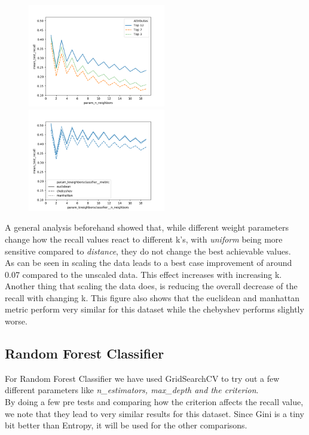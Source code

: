 \begin{figure}
\begin{floatrow}
    {\includegraphics[width=6cm]{onlineshop/plots/knn_wo_preprocessing.png}\label{fig:knn_wo_pre}}
    {\includegraphics[width=6cm]{onlineshop/plots/knn_uniform_metric_comparison.png}\label{fig:knn_w_pre}}
\end{floatrow}
\end{figure}
A general analysis beforehand showed that, while different weight parameters change how the recall values react to different k's, with \textit{uniform} being more sensitive compared to  \textit{distance}, they do not change the best achievable values.\\
\newline
As can be seen in  scaling the data leads to a best case improvement of around 0.07 compared to the unscaled data. This effect increases with increasing k. Another thing that scaling the data does, is reducing the overall decrease of the recall with changing k. This figure also shows that the euclidean and manhattan metric perform very similar for this dataset while the chebyshev performs slightly worse. 

\subsection{Random Forest Classifier}
For Random Forest Classifier we have used GridSearchCV to try out a few different parameters like \textit{n\_estimators, max\_depth and the criterion}. \\
\newline
By doing a few pre tests and comparing how the criterion affects the recall value, we note that they lead to very similar results for this dataset. Since Gini is a tiny bit better than Entropy, it will be used for the other comparisons. \\
\newline

